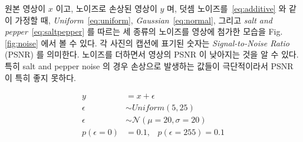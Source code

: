 \documentclass[a4paper, 12p]{paper}
\begin{document}
원본 영상이 $x$ 이고, 노이즈로 손상된 영상이 $y$ 며, 덧셈 노이즈를~\eqref{eq:additive} 와 같이 가정할 때, \textit{Uniform}~\eqref{eq:uniform}, \textit{Gaussian}~\eqref{eq:normal}, 그리고 \textit{salt and pepper}~\eqref{eq:saltpepper} 를 따르는 세 종류의 노이즈를 영상에 첨가한 모습을 Fig.\ref{fig:noise} 에서 볼 수 있다.  각 사진의 캡션에 표기된 숫자는 \textit{Signal-to-Noise Ratio} (PSNR) 를 의미한다. 노이즈를 더하면서 영상의 PSNR 이 낮아지는 것을 알 수 있다. 특히 salt and pepper noise 의 경우 손상으로 발생하는 값들이 극단적이라서 PSNR 이 특히 좋지 못하다.

\begin{align}
  y &= x + \epsilon \label{eq:additive} \\
  \epsilon &\sim Uniform(5, 25) \label{eq:uniform} \\
  \epsilon &\sim \mathcal{N}(\mu=20, \sigma=20) \label{eq:normal} \\
  p(\epsilon = 0) &= 0.1, \;\;\; p(\epsilon = 255) = 0.1 \label{eq:saltpepper}
\end{align}
\end{document}
